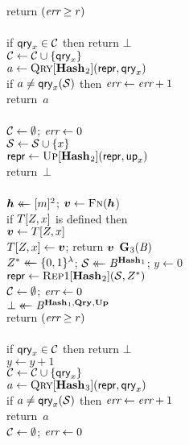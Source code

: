 \begin{figure}
{      return $(\textit{err} \geq r)$
    \\[6pt]
    \\[2pt]
      if $\mathsf{qry}_x \in \mathcal{C}$ then return $\bot$\\
      $\mathcal{C} \gets \mathcal{C} \cup \{\mathsf{qry}_x\}$\\
      $a \gets \textsc{Qry}[\mathbf{Hash}\hspace{0.5pt}_2](\mathsf{repr}, \mathsf{qry}_x)$\\
      if $a \neq \mathsf{qry}_x(\mathcal{S})$ then $\textit{err} \gets \textit{err} + 1$\\
      return~$a$
    \\[6pt]
    \\[2pt]
      $\mathcal{C} \gets \emptyset$; $\textit{err} \gets 0$\\
      $\mathcal{S} \gets \mathcal{S} \cup \{x\}$\\
      $\mathsf{repr} \gets \textsc{Up}[\mathbf{Hash}\hspace{0.5pt}_2](\mathsf{repr},\mathsf{up}_x)$\\
      return~$\bot$
    \\[6pt]
    \\[2pt]
      $\hh \getsr [m]^2$; $\vv \gets \fff(\hh$)\\
      if $T[Z,x]$ is defined then\\
      \tab $\vv \gets T[\salt,x]$\\
      $T[\salt,x] \gets \vv$;
      return $\vv$
  }
  {
    \underline{$\mathbf{G}\hspace{0.5pt}_3(\mathit{B})$}\\[2pt]
      $Z^* \mathrel{\leftarrow\mkern-14mu\leftarrow} \{0,1\}^\lambda$;
      $\mathcal{S} \mathrel{\leftarrow\mkern-14mu\leftarrow} \mathit{B}^{\mathbf{Hash}\hspace{0.5pt}_1}$;
      $y \gets 0$\\
      $\mathsf{repr} \gets \textsc{Rep}1[\mathbf{Hash}\hspace{0.5pt}_2](\mathcal{S}, Z^*)$\\
      $\mathcal{C} \gets \emptyset$;
      $\textit{err} \gets 0$\\
      $\bot \mathrel{\leftarrow\mkern-14mu\leftarrow} \mathit{B}^{\mathbf{Hash}\hspace{0.5pt}_1,\mathbf{Qry}\hspace{0.5pt},\mathbf{Up}\hspace{0.5pt}}$\\
      return $(\textit{err} \geq r)$
    \\[6pt]
    \\[2pt]
      if $\mathsf{qry}_x \in \mathcal{C}$ then return $\bot$\\
      $y \gets y+1$\\
      $\mathcal{C} \gets \mathcal{C} \cup \{\mathsf{qry}_x\}$\\
      $a \gets \textsc{Qry}[\mathbf{Hash}\hspace{0.5pt}_3](\mathsf{repr}, \mathsf{qry}_x)$\\
      if $a \neq \mathsf{qry}_x(\mathcal{S})$ then $\textit{err} \gets \textit{err} + 1$\\
      return~$a$
  }
  {
    \\[2pt]
      $\mathcal{C} \gets \emptyset$; $\textit{err} \gets 0$\\
}
\end{figure}
